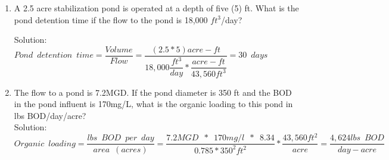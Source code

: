\begin{enumerate}
\item  A 2.5 acre stabilization pond is operated at a depth of five (5) ft. What is the pond detention time if the flow to the pond is 18,000 $ft^3$/day? 

Solution:\\
$Pond \enspace detention \enspace time=\dfrac{Volume}{Flow}=\dfrac{(2.5*5)acre-ft}{18,000\dfrac{ft^3}{day}*\dfrac{acre-ft}{43,560ft^3}}=\boxed{30 \enspace days}$\\ 

\item The flow to a pond is 7.2MGD. If the pond diameter is 350 ft and the BOD in the pond influent is 170mg/L, what is the organic loading to this pond in lbs BOD/day/acre?
\\
Solution:\\
$Organic \enspace loading=\dfrac{lbs \enspace BOD \enspace per \enspace day}{area \enspace (acres)}=\dfrac{7.2MGD \enspace * \enspace 170mg/l \enspace * \enspace 8.34}{0.785*350^2ft^2}*\dfrac{43,560ft^2}{acre}=\boxed{\dfrac{4,624lbs \enspace BOD}{day-acre}}$
\end{enumerate}
